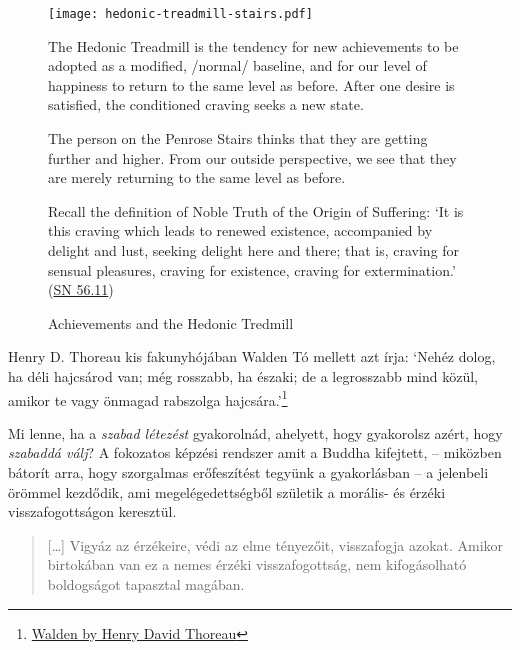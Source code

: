 \begin{figure}[h]
\caption{Achievements and the Hedonic Tredmill}\label{fig-hedonic-treadmill}

\centering

\texttt{[image: hedonic-treadmill-stairs.pdf]}

\bigskip

{\small

The Hedonic Treadmill is the tendency for new achievements to be adopted as a modified, /normal/ baseline,
and for our level of happiness to return to the same level as before.
After one desire is satisfied, the conditioned craving seeks a new state.

\bigskip

The person on the Penrose Stairs thinks that
they are getting further and higher.
From our outside perspective,
we see that they are merely returning to the same level as before.

\bigskip

Recall the definition of Noble Truth of the Origin of Suffering:
`It is this craving which leads to renewed existence,
 accompanied by delight and lust, seeking delight here and there;
 that is, craving for sensual pleasures, craving for existence,
 craving for extermination.'
(\href{https://suttacentral.net/sn56.11/en/bodhi}{SN 56.11})

}

\end{figure}


\clearpage

Henry D. Thoreau kis fakunyhójában Walden Tó mellett azt írja: `Nehéz
dolog, ha déli hajcsárod van; még rosszabb, ha északi; de a legrosszabb
mind közül, amikor te vagy önmagad rabszolga hajcsára.'\footnote{\href{https://www.goodreads.com/book/show/16902.Walden}{Walden
  by Henry David Thoreau}}

Mi lenne, ha a \emph{szabad létezést} gyakorolnád, ahelyett, hogy
gyakorolsz azért, hogy \emph{szabaddá válj}? A fokozatos képzési
rendszer amit a Buddha kifejtett, -- miközben bátorít arra, hogy
szorgalmas erőfeszítést tegyünk a gyakorlásban -- a jelenbeli örömmel
kezdődik, ami megelégedettségből születik a morális- és érzéki
visszafogottságon keresztül.

\begin{quote}
{[}\ldots{]} Vigyáz az érzékeire, védi az elme tényezőit, visszafogja
azokat. Amikor birtokában van ez a nemes érzéki visszafogottság, nem
kifogásolható boldogságot tapasztal magában.

\bigskip

\end{quote}

